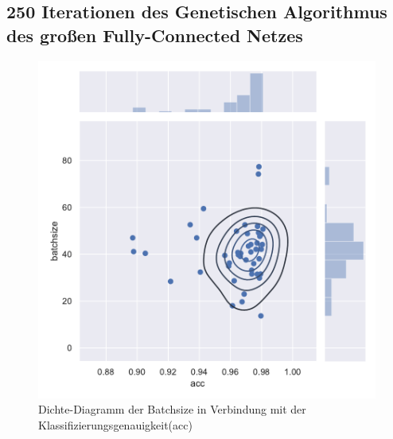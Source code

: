 \subsection{250 Iterationen des Genetischen Algorithmus des großen Fully-Connected Netzes}
\begin{figure}[H]
  \centering  
  \includegraphics[scale=0.5]{anhang/GA_250_mnist_digits_False_big_jointplot_batchsize.pdf}
  \caption{Dichte-Diagramm der Batchsize in Verbindung mit der Klassifizierungsgenauigkeit(acc)}
  
\end{figure}

